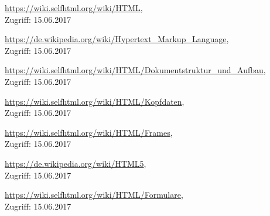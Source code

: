\documentclass[12pt,a4paper,bibliography=totocnumbered,listof=totocnumbered]{scrartcl}
\begin{document}
\begin{thebibliography}{999}


\url{https://wiki.selfhtml.org/wiki/HTML}, \\
Zugriff: 15.06.2017

\url{https://de.wikipedia.org/wiki/Hypertext\_Markup\_Language},\\
Zugriff: 15.06.2017

\url{https://wiki.selfhtml.org/wiki/HTML/Dokumentstruktur\_und\_Aufbau}, \\
Zugriff: 15.06.2017

\url{https://wiki.selfhtml.org/wiki/HTML/Kopfdaten}, \\
Zugriff: 15.06.2017

\url{https://wiki.selfhtml.org/wiki/HTML/Frames}, \\
Zugriff: 15.06.2017

\url{https://de.wikipedia.org/wiki/HTML5}, \\
Zugriff: 15.06.2017

\url{https://wiki.selfhtml.org/wiki/HTML/Formulare}, \\
Zugriff: 15.06.2017




\end{thebibliography}
%
%
\pagebreak


\setcounter{page}{1}
\end{document}
